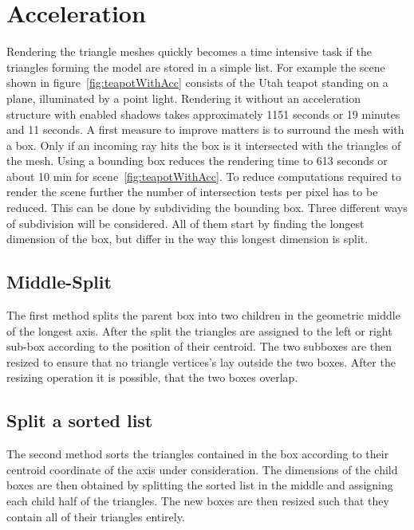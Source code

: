 \section{Acceleration}
Rendering the triangle meshes quickly becomes a time intensive task if the triangles forming the model are stored in a simple list. For example the scene shown in figure~\ref{fig:teapotWithAcc} consists of the Utah teapot standing on a plane, illuminated by a point light. Rendering it without an acceleration structure with enabled shadows takes approximately 1151 seconds or 19 minutes and 11 seconds. A first measure to improve matters is to surround the mesh with a box. Only if an incoming ray hits the box is it intersected with the triangles of the mesh. Using a bounding box reduces the rendering time to 613 seconds or about 10 min for scene~\ref{fig:teapotWithAcc}. To reduce computations required to render the scene further the number of intersection tests per pixel has to be reduced. This can be done by subdividing the bounding box. Three different ways of subdivision will be considered. All of them start by finding the longest dimension of the box, but differ in the way this longest dimension is split.
\subsection{Middle-Split}
The first method splits the parent box into two children in the geometric middle of the longest axis. After the split the triangles are assigned to the
left or right sub-box according to the position of their centroid. The two subboxes are then resized to ensure that no triangle vertices's lay outside the two boxes. After the resizing operation it is possible, that the two boxes overlap.   
\subsection{Split a sorted list}
The second method sorts the triangles contained in the box according to their centroid coordinate of the axis under consideration. The dimensions of the child boxes are then obtained by splitting the sorted list in the middle and assigning each child half of the triangles. The new boxes are then resized such that they contain all of their triangles entirely.
